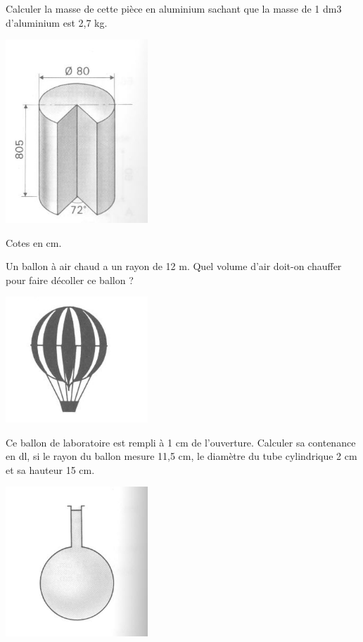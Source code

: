 \begin{exercice}
Calculer la masse de cette pièce en aluminium sachant que la masse de 1 dm3 d’aluminium est 2,7 kg. 
\begin{center}
\includegraphics[width= 0.4\textwidth]{volume/image/volume13.png}
\end{center}
Cotes en cm. 
\end{exercice}

\begin{exercice}
Un ballon à air chaud a un rayon de 12 m. Quel volume d’air doit-on chauffer pour faire décoller ce ballon ? 
\begin{center}
\includegraphics[width= 0.4\textwidth]{volume/image/volume14.png}
\end{center}
\end{exercice}

\begin{exercice}
Ce ballon de laboratoire est rempli à 1 cm de l’ouverture. Calculer sa contenance en dl, si le rayon du ballon mesure 11,5 cm, le diamètre du tube cylindrique 2 cm et sa hauteur 15 cm. 
\begin{center}
\includegraphics[width= 0.4\textwidth]{volume/image/volume15.png}
\end{center}
\end{exercice}